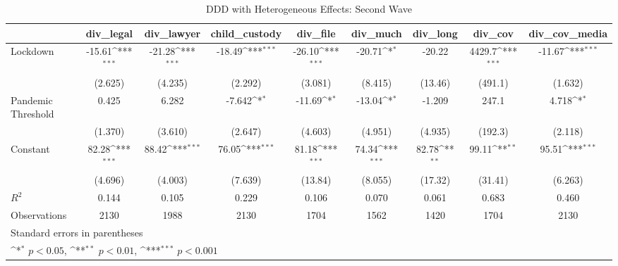 \documentclass{article}
\begin{document}
{
\def\sym#1{\ifmmode^{#1}\else\(^{#1}\)\fi}
\begin{longtable}{l*{8}{c}}
\caption{DDD with Heterogeneous Effects: Second Wave}\\
\hline\hline\endfirsthead\hline\endhead\hline\endfoot\endlastfoot
                &\multicolumn{1}{c}{div\_legal}&\multicolumn{1}{c}{div\_lawyer}&\multicolumn{1}{c}{child\_custody}&\multicolumn{1}{c}{div\_file}&\multicolumn{1}{c}{div\_much}&\multicolumn{1}{c}{div\_long}&\multicolumn{1}{c}{div\_cov}&\multicolumn{1}{c}{div\_cov\_media}\\
\hline
Lockdown        &   -15.61\sym{***}&   -21.28\sym{***}&   -18.49\sym{***}&   -26.10\sym{***}&   -20.71\sym{*}  &   -20.22         &   4429.7\sym{***}&   -11.67\sym{***}\\
                &  (2.625)         &  (4.235)         &  (2.292)         &  (3.081)         &  (8.415)         &  (13.46)         &  (491.1)         &  (1.632)         \\
Pandemic Threshold&    0.425         &    6.282         &   -7.642\sym{*}  &   -11.69\sym{*}  &   -13.04\sym{*}  &   -1.209         &    247.1         &    4.718\sym{*}  \\
                &  (1.370)         &  (3.610)         &  (2.647)         &  (4.603)         &  (4.951)         &  (4.935)         &  (192.3)         &  (2.118)         \\
Constant        &    82.28\sym{***}&    88.42\sym{***}&    76.05\sym{***}&    81.18\sym{***}&    74.34\sym{***}&    82.78\sym{**} &    99.11\sym{**} &    95.51\sym{***}\\
                &  (4.696)         &  (4.003)         &  (7.639)         &  (13.84)         &  (8.055)         &  (17.32)         &  (31.41)         &  (6.263)         \\
\hline
\(R^{2}\)       &    0.144         &    0.105         &    0.229         &    0.106         &    0.070         &    0.061         &    0.683         &    0.460         \\
Observations    &     2130         &     1988         &     2130         &     1704         &     1562         &     1420         &     1704         &     2130         \\
\hline\hline
\multicolumn{9}{l}{\footnotesize Standard errors in parentheses}\\
\multicolumn{9}{l}{\footnotesize \sym{*} \(p<0.05\), \sym{**} \(p<0.01\), \sym{***} \(p<0.001\)}\\
\end{longtable}
}
\end{document}
